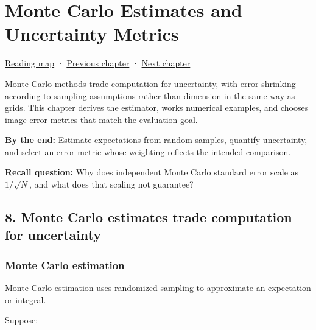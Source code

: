 \chapter{Monte Carlo Estimates and Uncertainty Metrics}\label{02-foundations-ii-ch030-monte-carlo-estimates-and-uncertainty-metrics}\hypertarget{02-foundations-ii-ch030}{}\label{stagechapter:02-foundations-ii-ch030}

\hypertarget{02-foundations-ii-ch030-monte-carlo-estimates-and-uncertainty-metrics}{}

\hyperref[volume-reading-map]{Reading map} · \hyperref[02-foundations-ii-ch029-discretization-convergence-and-experimental-design]{Previous chapter} · \hyperref[02-foundations-ii-ch031-implement-probability-with-numerical-contracts]{Next chapter}

Monte Carlo methods trade computation for uncertainty, with error shrinking according to sampling assumptions rather than dimension in the same way as grids. This chapter derives the estimator, works numerical examples, and chooses image-error metrics that match the evaluation goal.

\textbf{By the end:} Estimate expectations from random samples, quantify uncertainty, and select an error metric whose weighting reflects the intended comparison.

\textbf{Recall question:} Why does independent Monte Carlo standard error scale as \(1/\sqrt{N}\), and what does that scaling not guarantee?

\section{8. Monte Carlo estimates trade computation for uncertainty}\label{02-foundations-ii-ch030-monte-carlo-estimates-trade-computation-for-uncertainty}

\hypertarget{02-foundations-ii-ch030-monte-carlo-estimates-trade-computation-for-uncertainty}{}

\subsection{Monte Carlo estimation}\label{02-foundations-ii-ch030-monte-carlo-estimation}

\hypertarget{02-foundations-ii-ch030-monte-carlo-estimation}{}

Monte Carlo estimation uses randomized sampling to approximate an expectation or integral.

Suppose:

